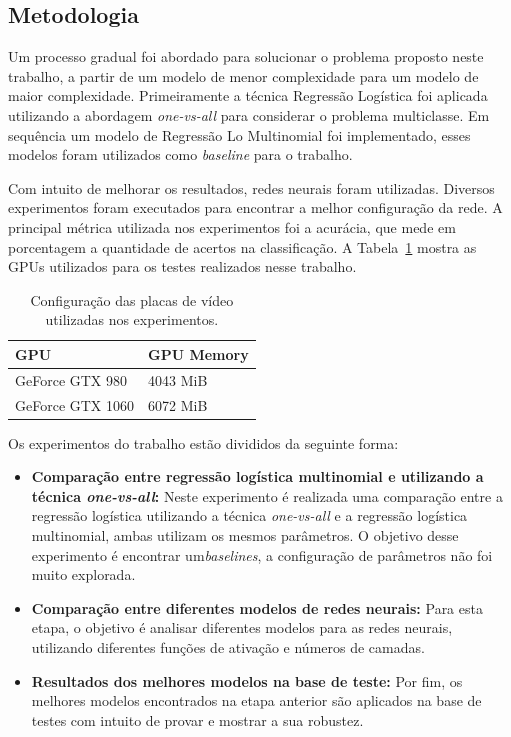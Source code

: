 \documentclass[conference]{IEEEtran}
\begin{document}
\subsection{Metodologia} \label{sec:met}

Um processo gradual foi abordado para solucionar o problema proposto neste trabalho, a partir de um modelo de menor complexidade para um modelo de maior complexidade. Primeiramente a técnica Regressão Logística foi aplicada utilizando a abordagem \emph{one-vs-all} para considerar o problema multiclasse. Em sequência um modelo de Regressão Lo Multinomial foi implementado, esses modelos foram utilizados como \emph{baseline} para o trabalho.

Com intuito de melhorar os resultados, redes neurais foram utilizadas. Diversos experimentos foram executados para encontrar a melhor configuração da rede. A principal métrica utilizada nos experimentos foi a acurácia, que mede em porcentagem a quantidade de acertos na classificação. A Tabela~\ref{tab:config} mostra as GPUs utilizados para os testes realizados nesse trabalho.


\begin{table}[h!]
	\centering
	\begin{tabular}{ll} \toprule
		  \textbf{GPU} & \textbf{GPU Memory} \\ \toprule 	
		  GeForce GTX 980 & 4043 MiB \\ 
		  GeForce GTX 1060 & 6072 MiB \\ 
		 \bottomrule
	\end{tabular}
	\caption{Configuração das placas de vídeo utilizadas nos experimentos.}
	\label{tab:config}
\end{table}

Os experimentos do trabalho estão divididos da seguinte forma: 

\begin{itemize}
	\item \textbf{Comparação entre regressão logística multinomial e utilizando a técnica \emph{one-vs-all}:} Neste experimento é realizada uma comparação entre a regressão logística utilizando a técnica \emph{one-vs-all} e a regressão logística multinomial, ambas utilizam os mesmos parâmetros. O objetivo desse experimento é encontrar um\emph{baselines}, a configuração de parâmetros não foi muito explorada.
	
	\item \textbf{Comparação entre diferentes modelos de redes neurais:} Para esta etapa, o objetivo é analisar diferentes modelos para as redes neurais, utilizando diferentes funções de ativação e números de camadas.  
	
	\item \textbf{Resultados dos melhores modelos na base de teste:} Por fim, os melhores modelos encontrados na etapa anterior são aplicados na base de testes com intuito de provar e mostrar a sua robustez.
\end{itemize}
\end{document}
